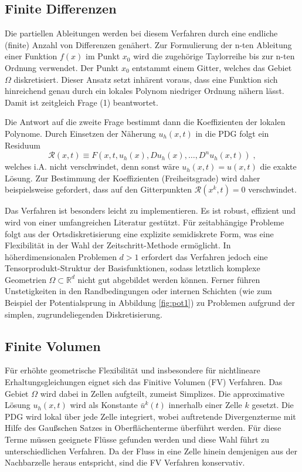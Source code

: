\subsection{Finite Differenzen}\label{sec:FD}
Die partiellen Ableitungen werden bei diesem Verfahren durch eine endliche (finite) Anzahl von Differenzen genähert. Zur Formulierung der n-ten Ableitung einer Funktion $f(x)$ im Punkt $x_0$ wird die zugehörige Taylorreihe bis zur n-ten Ordnung verwendet. Der Punkt $x_0$ entstammt einem Gitter, welches das Gebiet $\Omega$ diskretisiert. Dieser Ansatz setzt inhärent voraus, dass eine Funktion sich hinreichend genau durch ein lokales Polynom niedriger Ordnung nähern lässt. Damit ist zeitgleich Frage (1) beantwortet.

Die Antwort auf die zweite Frage bestimmt dann die Koeffizienten der lokalen Polynome. Durch Einsetzen der Näherung $u_h(x,t)$ in die PDG folgt ein Residuum
\begin{equation}
  \mathcal{R}(x,t)\equiv F(x,t, u_h(x), Du_h(x), \dots, D^nu_h(x,t)) \; ,
\end{equation}
welches i.A. nicht verschwindet, denn sonst wäre ${u_h(x,t) = u(x,t)}$ die exakte Lösung. Zur Bestimmung der Koeffizienten (Freiheitsgrade) wird daher beispielsweise gefordert, dass auf den Gitterpunkten ${\mathcal{R}(x^k,t)=0}$ verschwindet.

Das Verfahren ist besonders leicht zu implementieren. Es ist robust, effizient und wird von einer umfangreichen Literatur gestützt. Für zeitabhängige Probleme folgt aus der Ortsdiskretisierung eine explizite semidiskrete Form, was eine Flexibilität in der Wahl der Zeitschritt-Methode ermöglicht. In höherdimensionalen Problemen $d>1$ erfordert das Verfahren jedoch eine Tensorprodukt-Struktur der Basisfunktionen, sodass letztlich komplexe Geometrien $\Omega\subset{\mathbb{R}^d}$ nicht gut abgebildet werden können. Ferner führen Unstetigkeiten in den Randbedingungen oder internen Schichten (wie zum Beispiel der Potentialsprung in Abbildung \ref{fig:pot1}) zu Problemen aufgrund der simplen, zugrundeliegenden Diskretisierung.

\subsection{Finite Volumen}
Für erhöhte geometrische Flexibilität und insbesondere für nichtlineare Erhaltungsgleichungen eignet sich das Finitive Volumen (FV) Verfahren. Das Gebiet $\Omega$ wird dabei in Zellen aufgteilt, zumeist Simplizes. Die approximative Lösung $u_h(x,t)$ wird als Konstante $\bar{u}^k(t)$ innerhalb einer Zelle $k$ gesetzt. Die PDG wird lokal über jede Zelle integriert, wobei auftretende Divergenzterme mit Hilfe des Gaußschen Satzes in Oberflächenterme überführt werden. Für diese Terme müssen geeignete Flüsse gefunden werden und diese Wahl führt zu unterschiedlichen Verfahren. Da der Fluss in eine Zelle hinein demjenigen aus der Nachbarzelle heraus entspricht, sind die FV Verfahren konservativ.

